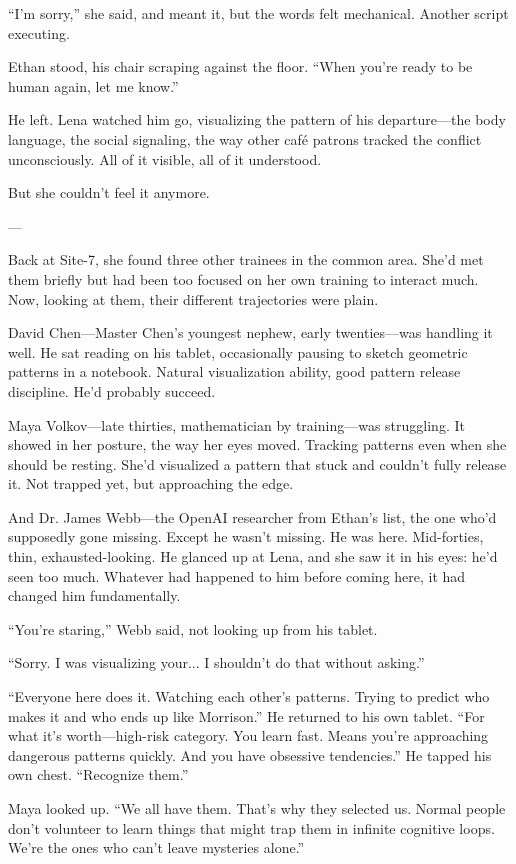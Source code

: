 ``I'm sorry,'' she said, and meant it, but the words felt mechanical. Another script executing.

Ethan stood, his chair scraping against the floor. ``When you're ready to be human again, let me know.''

He left. Lena watched him go, visualizing the pattern of his departure—the body language, the social signaling, the way other café patrons tracked the conflict unconsciously. All of it visible, all of it understood.

But she couldn't feel it anymore.

---

Back at Site-7, she found three other trainees in the common area. She'd met them briefly but had been too focused on her own training to interact much. Now, looking at them, their different trajectories were plain.

David Chen—Master Chen's youngest nephew, early twenties—was handling it well. He sat reading on his tablet, occasionally pausing to sketch geometric patterns in a notebook. Natural visualization ability, good pattern release discipline. He'd probably succeed.

Maya Volkov—late thirties, mathematician by training—was struggling. It showed in her posture, the way her eyes moved. Tracking patterns even when she should be resting. She'd visualized a pattern that stuck and couldn't fully release it. Not trapped yet, but approaching the edge.

And Dr. James Webb—the OpenAI researcher from Ethan's list, the one who'd supposedly gone missing. Except he wasn't missing. He was here. Mid-forties, thin, exhausted-looking. He glanced up at Lena, and she saw it in his eyes: he'd seen too much. Whatever had happened to him before coming here, it had changed him fundamentally.

``You're staring,'' Webb said, not looking up from his tablet.

``Sorry. I was visualizing your... I shouldn't do that without asking.''

``Everyone here does it. Watching each other's patterns. Trying to predict who makes it and who ends up like Morrison.'' He returned to his own tablet. ``For what it's worth—high-risk category. You learn fast. Means you're approaching dangerous patterns quickly. And you have obsessive tendencies.'' He tapped his own chest. ``Recognize them.''

Maya looked up. ``We all have them. That's why they selected us. Normal people don't volunteer to learn things that might trap them in infinite cognitive loops. We're the ones who can't leave mysteries alone.''

